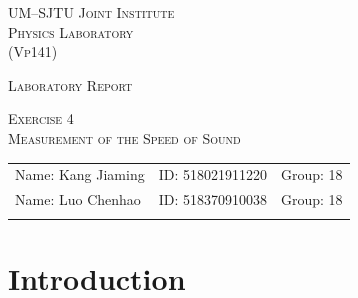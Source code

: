 \documentclass[a4paper]{article}
\begin{document}
\vspace*{0.4cm}

\hrulefill %

\thispagestyle{empty} %

\begin{center}
\begin{large}
\scshape{UM--SJTU Joint Institute \vspace{0.3em} \\ Physics Laboratory \\(Vp141)}
\end{large}

\hrulefill %

\vspace*{6cm}
\begin{Large}
\scshape{{Laboratory Report}}
\end{Large}

\vspace{2em}

\begin{large}
\scshape{Exercise 4}\\
\vspace{0.5em}
\scshape{Measurement of the Speed of Sound}
\end{large}
\end{center}
\vfill %

\begin{table}[htbp] %
\flushleft
\begin{tabular}{lll}
Name: Kang Jiaming \hspace*{3em} & ID: 518021911220 \hspace*{3em} & Group: 18\\
Name: Luo Chenhao \hspace*{3em} & ID: 518370910038 \hspace*{3em} & Group: 18\\
\\
\end{tabular}
\end{table}

\hfill %
\newpage
\tableofcontents
\setcounter{page}{0} %
\thispagestyle{empty}
\newpage



\section{Introduction}\label{sec:intro}
\end{document}

